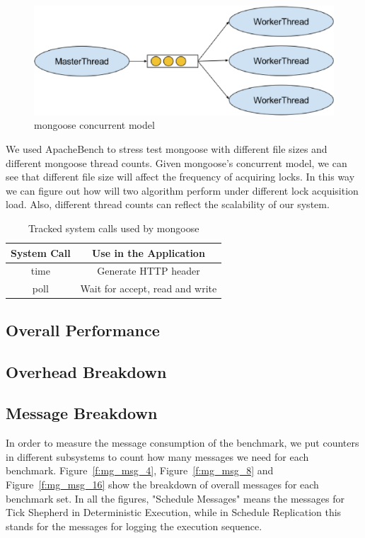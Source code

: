 \begin{figure}
\centering
\includegraphics[width=0.6\columnwidth]{figures/mongoose_model}
\caption{mongoose concurrent model}
\label{f:mongoose_model}
\end{figure}

We used ApacheBench to stress test mongoose with different file sizes and different mongoose thread counts. Given mongoose's concurrent model, we can see that different file size will affect the frequency of acquiring locks. In this way we can figure out how will two algorithm perform under different lock acquisition load. Also, different thread counts can reflect the scalability of our system.

\begin{table}
\caption{Tracked system calls used by mongoose}
\begin{center}
 \begin{tabular}{c | c}
System Call & Use in the Application\\ \hline
 time & Generate HTTP header  \\ \hline
 poll & Wait for accept, read and write
 \end{tabular}
\end{center}
\label{t:mongoose_syscall}
\end{table}

\subsection{Overall Performance}

\subsection{Overhead Breakdown}

\subsection{Message Breakdown}
In order to measure the message consumption of the benchmark, we put counters in different subsystems to count how many messages we need for each benchmark. Figure~\ref{f:mg_msg_4}, Figure~\ref{f:mg_msg_8} and Figure~\ref{f:mg_msg_16} show the breakdown of overall messages for each benchmark set. In all the figures, "Schedule Messages" means the messages for Tick Shepherd in Deterministic Execution, while in Schedule Replication this stands for the messages for logging the execution sequence.

